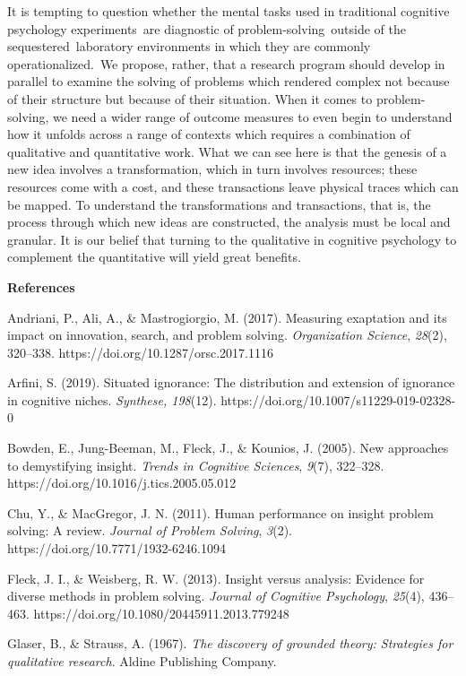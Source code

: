 \documentclass{article}
\begin{document}
It is tempting to question whether the mental tasks used in traditional cognitive psychology experiments are diagnostic of problem-solving outside of the sequestered laboratory environments in which they are commonly operationalized. We propose, rather, that a research program should develop in parallel to examine the solving of problems which rendered complex not because of their structure but because of their situation. When it comes to problem-solving, we need a wider range of outcome measures to even begin to understand how it unfolds across a range of contexts which requires a combination of qualitative and quantitative work. What we can see here is that the genesis of a new idea involves a transformation, which in turn involves resources; these resources come with a cost, and these transactions leave physical traces which can be mapped. To understand the transformations and transactions, that is, the process through which new ideas are constructed, the analysis must be local and granular. It is our belief that turning to the qualitative in cognitive psychology to complement the quantitative will yield great benefits.

\textbf{}

\textbf{References}

Andriani, P., Ali, A., \& Mastrogiorgio, M. (2017). Measuring exaptation and its impact on innovation, search, and problem solving. \emph{Organization Science}, \emph{28}(2), 320--338. https://doi.org/10.1287/orsc.2017.1116

Arfini, S. (2019). Situated ignorance: The distribution and extension of ignorance in cognitive niches. \emph{Synthese, 198}(12). https://doi.org/10.1007/s11229-019-02328-0

Bowden, E., Jung-Beeman, M., Fleck, J., \& Kounios, J. (2005). New approaches to demystifying insight. \emph{Trends in Cognitive Sciences}, \emph{9}(7), 322--328. https://doi.org/10.1016/j.tics.2005.05.012

Chu, Y., \& MacGregor, J. N. (2011). Human performance on insight problem solving: A review. \emph{Journal of Problem Solving}, \emph{3}(2). https://doi.org/10.7771/1932-6246.1094

Fleck, J. I., \& Weisberg, R. W. (2013). Insight versus analysis: Evidence for diverse methods in problem solving. \emph{Journal of Cognitive Psychology}, \emph{25}(4), 436--463. https://doi.org/10.1080/20445911.2013.779248

Glaser, B., \& Strauss, A. (1967). \emph{The discovery of grounded theory: Strategies for qualitative research}. Aldine Publishing Company.
\end{document}
